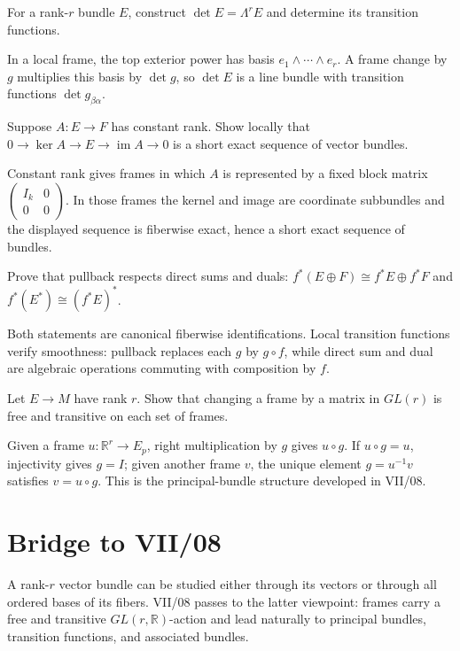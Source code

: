 \begin{problem}\label{prob:vii07-ch02}
For a rank-\(r\) bundle \(E\), construct \(\det E=\Lambda^rE\) and determine its transition functions.
\end{problem}
\begin{solution}
In a local frame, the top exterior power has basis \(e_1\wedge\cdots\wedge e_r\). A frame change by \(g\) multiplies this basis by \(\det g\), so \(\det E\) is a line bundle with transition functions \(\det g_{\beta\alpha}\).
\end{solution}

\begin{problem}\label{prob:vii07-ch03}
Suppose \(A:E\to F\) has constant rank. Show locally that \(0\to\ker A\to E\to\operatorname{im}A\to0\) is a short exact sequence of vector bundles.
\end{problem}
\begin{solution}
Constant rank gives frames in which \(A\) is represented by a fixed block matrix \(\begin{pmatrix}I_k&0\\0&0\end{pmatrix}\). In those frames the kernel and image are coordinate subbundles and the displayed sequence is fiberwise exact, hence a short exact sequence of bundles.
\end{solution}

\begin{problem}\label{prob:vii07-ch04}
Prove that pullback respects direct sums and duals: \(f^*(E\oplus F)\cong f^*E\oplus f^*F\) and \(f^*(E^*)\cong(f^*E)^*\).
\end{problem}
\begin{solution}
Both statements are canonical fiberwise identifications. Local transition functions verify smoothness: pullback replaces each \(g\) by \(g\circ f\), while direct sum and dual are algebraic operations commuting with composition by \(f\).
\end{solution}

\begin{problem}\label{prob:vii07-ch05}
Let \(E\to M\) have rank \(r\). Show that changing a frame by a matrix in \(GL(r)\) is free and transitive on each set of frames.
\end{problem}
\begin{solution}
Given a frame \(u:\mathbb R^r\to E_p\), right multiplication by \(g\) gives \(u\circ g\). If \(u\circ g=u\), injectivity gives \(g=I\); given another frame \(v\), the unique element \(g=u^{-1}v\) satisfies \(v=u\circ g\). This is the principal-bundle structure developed in VII/08.
\end{solution}

\section*{Bridge to VII/08}
A rank-\(r\) vector bundle can be studied either through its vectors or through all ordered bases of its fibers. VII/08 passes to the latter viewpoint: frames carry a free and transitive \(GL(r,\mathbb R)\)-action and lead naturally to principal bundles, transition functions, and associated bundles.
